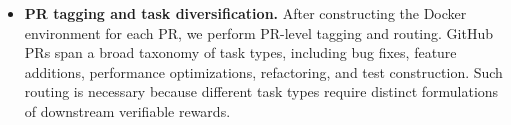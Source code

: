 \begin{itemize}


    \item \textbf{PR tagging and task diversification.} After constructing the Docker environment for each PR, we perform PR-level tagging and routing. GitHub PRs span a broad taxonomy of task types, including bug fixes, feature additions, performance optimizations, refactoring, and test construction. Such routing is necessary because different task types require distinct formulations of downstream verifiable rewards.
    


\end{itemize}
